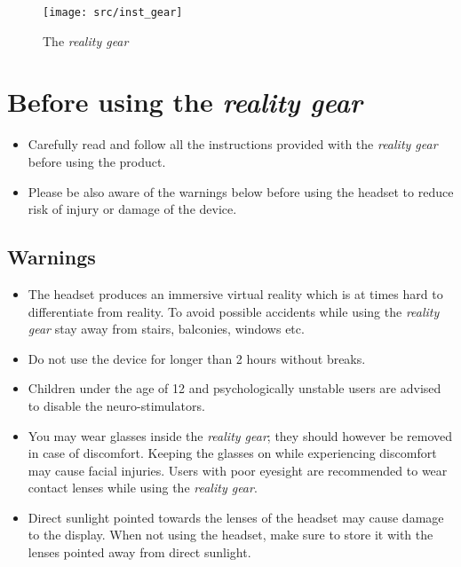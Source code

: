\begin{figure}[!ht]
\begin{center}
\texttt{[image: src/inst\_gear]}
\end{center}
\caption[The \emph{\pokeT{} reality gear}]{The \emph{\poke{} reality gear}}
\label{gear}
\end{figure}

\newpage
\section[Before using the \emph{\pokeT{} reality gear}]{Before using the \emph{\poke{} reality gear}}
\begin{itemize}
\item Carefully read and follow all the instructions provided with the \emph{\poke{} reality gear} before using the product.
\item Please be also aware of the warnings below before using the headset to reduce risk of injury or damage of the device.
\end{itemize}

\subsection*{Warnings}
\begin{itemize}
\item The headset produces an immersive virtual reality which is at times hard to differentiate from reality. To avoid possible accidents while using the \emph{\poke{} reality gear} stay away from stairs, balconies, windows etc.
\item Do not use the device for longer than 2 hours without breaks. 
\item Children under the age of 12 and psychologically unstable users are advised to disable the neuro-stimulators.
\item You may wear glasses inside the \emph{\poke{} reality gear}; they should however be removed in case of discomfort. Keeping the glasses on while experiencing discomfort may cause facial injuries. Users with poor eyesight are recommended to wear contact lenses while using the \emph{\poke{} reality gear}.
\item Direct sunlight pointed towards the lenses of the headset may cause damage to the display. When not using the headset, make sure to store it with the lenses pointed away from direct sunlight.
\end{itemize}

